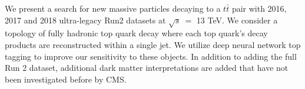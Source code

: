 
We present a search for new massive particles decaying to a $t\bar{t}$ pair with 2016, 2017 and 2018
ultra-legacy Run2 datasets at $\sqrt{s}\ =$ 13 TeV. We consider a topology of fully hadronic top quark decay where each
top quark’s decay products are reconstructed within a single jet. We utilize deep neural network top tagging
to improve our sensitivity to these objects. In addition to adding the full Run 2 dataset, additional dark matter interpretations are added that have not been investigated before by CMS.

